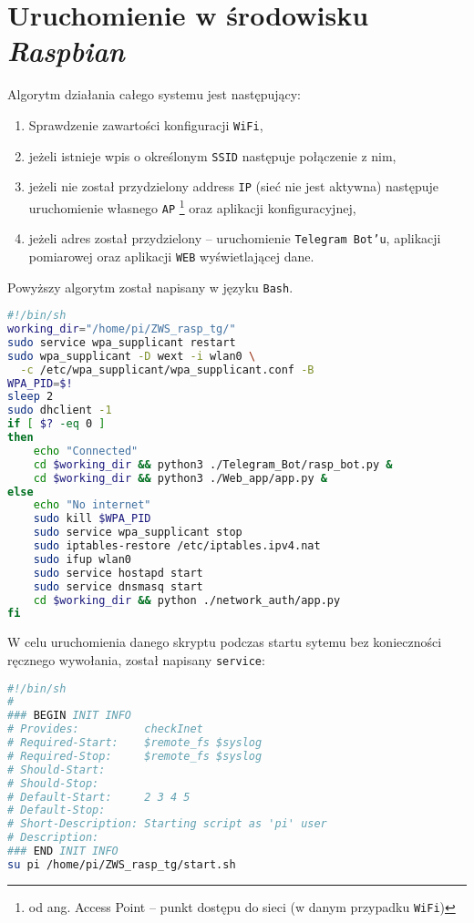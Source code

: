 \section{Uruchomienie w środowisku \textsl{Raspbian}}
Algorytm działania całego systemu jest następujący:
\begin{enumerate}
  \item Sprawdzenie zawartości konfiguracji \texttt{WiFi},
  \item jeżeli istnieje wpis o określonym \texttt{SSID}	
    następuje połączenie z nim,
  \item jeżeli nie został przydzielony address \texttt{IP} (sieć nie jest aktywna)
    następuje uruchomienie własnego \texttt{AP}
    \footnote{od ang. Access Point -- punkt dostępu 
    do sieci (w danym przypadku \texttt{WiFi})} oraz
    aplikacji konfiguracyjnej,
  \item jeżeli adres został przydzielony -- uruchomienie \texttt{Telegram Bot'u},
    aplikacji pomiarowej oraz aplikacji \texttt{WEB} wyświetlającej dane.
\end{enumerate}

Powyższy algorytm został napisany w języku \texttt{Bash}.
\begin{lstlisting}[basicstyle=\ttfamily\small, language=bash, frame=single,
  caption={Uruchomienie procesów w systemie \textsl{Raspbian}}]
#!/bin/sh
working_dir="/home/pi/ZWS_rasp_tg/"
sudo service wpa_supplicant restart
sudo wpa_supplicant -D wext -i wlan0 \
  -c /etc/wpa_supplicant/wpa_supplicant.conf -B
WPA_PID=$!
sleep 2
sudo dhclient -1
if [ $? -eq 0 ]
then
	echo "Connected"
	cd $working_dir && python3 ./Telegram_Bot/rasp_bot.py &
	cd $working_dir && python3 ./Web_app/app.py &
else
	echo "No internet"
	sudo kill $WPA_PID
	sudo service wpa_supplicant stop
	sudo iptables-restore /etc/iptables.ipv4.nat
	sudo ifup wlan0
	sudo service hostapd start
	sudo service dnsmasq start
	cd $working_dir && python ./network_auth/app.py
fi
\end{lstlisting}
W celu uruchomienia danego skryptu podczas startu sytemu bez
konieczności ręcznego wywołania, został napisany \texttt{service}:
\begin{lstlisting}[basicstyle=\ttfamily\small, language=bash, frame=single,
  caption={\texttt{service} wywołujący skrypt}]
#!/bin/sh
#
### BEGIN INIT INFO
# Provides:          checkInet
# Required-Start:    $remote_fs $syslog
# Required-Stop:     $remote_fs $syslog
# Should-Start: 
# Should-Stop:
# Default-Start:     2 3 4 5
# Default-Stop:      
# Short-Description: Starting script as 'pi' user 
# Description:
### END INIT INFO
su pi /home/pi/ZWS_rasp_tg/start.sh
\end{lstlisting}
